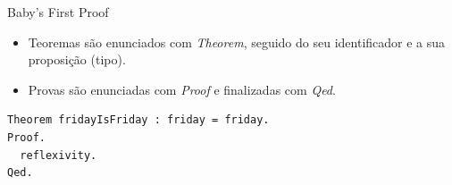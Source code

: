 \documentclass[presentation]{beamer}
\begin{document}
\begin{frame}[fragile,label={sec:org955f9f3}]{Baby's First Proof}
 \begin{itemize}
\item Teoremas são enunciados com \emph{Theorem}, seguido do seu identificador e a sua proposição (tipo).
\item Provas são enunciadas com \emph{Proof} e finalizadas com \emph{Qed}.
\end{itemize}
\begin{verbatim}
Theorem fridayIsFriday : friday = friday.
Proof.
  reflexivity.
Qed.
\end{verbatim}
\end{frame}
\end{document}

